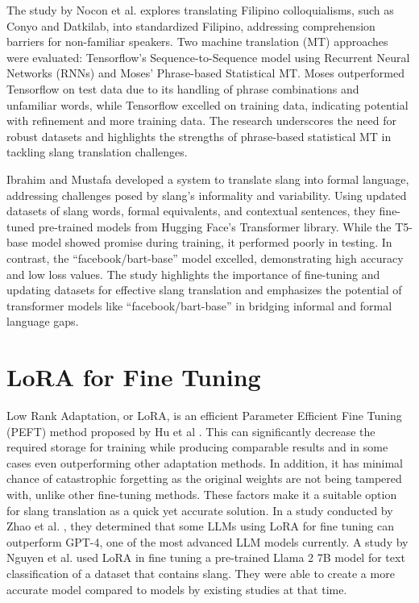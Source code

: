 The study by Nocon et al. \cite{Nocon_Kho_Arroyo_2018} explores translating Filipino colloquialisms, such as Conyo and Datkilab, into standardized Filipino, addressing comprehension barriers for non-familiar speakers. Two machine translation (MT) approaches were evaluated: Tensorflow's Sequence-to-Sequence model using Recurrent Neural Networks (RNNs) and Moses' Phrase-based Statistical MT. Moses outperformed Tensorflow on test data due to its handling of phrase combinations and unfamiliar words, while Tensorflow excelled on training data, indicating potential with refinement and more training data. The research underscores the need for robust datasets and highlights the strengths of phrase-based statistical MT in tackling slang translation challenges.

Ibrahim and Mustafa \cite{Abdulstar_Ibrahim_Shareef_Mustafa_2023} developed a system to translate slang into formal language, addressing challenges posed by slang's informality and variability. Using updated datasets of slang words, formal equivalents, and contextual sentences, they fine-tuned pre-trained models from Hugging Face's Transformer library. While the T5-base model showed promise during training, it performed poorly in testing. In contrast, the “facebook/bart-base” model excelled, demonstrating high accuracy and low loss values. The study highlights the importance of fine-tuning and updating datasets for effective slang translation and emphasizes the potential of transformer models like “facebook/bart-base” in bridging informal and formal language gaps. 


\section{LoRA for Fine Tuning}
Low Rank Adaptation, or LoRA, is an efficient Parameter Efficient Fine Tuning (PEFT) method proposed by Hu et al \cite{hu2021loralowrankadaptationlarge}.
This can significantly decrease the required storage for training while producing comparable results and in some cases even outperforming other adaptation methods.
In addition, it has minimal chance of catastrophic forgetting as the original weights are not being tampered with, unlike other fine-tuning methods.
These factors make it a suitable option for slang translation as a quick yet accurate solution.
In a study conducted by Zhao et al. \cite{zhao2024loraland310finetuned}, they determined that some LLMs using LoRA for fine tuning can outperform GPT-4, one of the most advanced LLM models currently.
A study by Nguyen et al. \cite{nguyen2023finetuningllama2large} used LoRA in fine tuning a pre-trained Llama 2 7B model for text classification of a dataset that contains slang.
They were able to create a more accurate model compared to models by existing studies at that time. 

